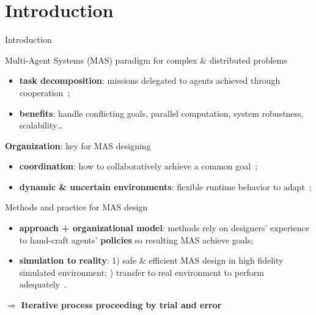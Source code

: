 \AtBeginSection[]{
    \begin{frame}
        \frametitle{}
        \tableofcontents[currentsection]
    \end{frame}
}


\section{Introduction}
\begin{frame}[allowframebreaks]{Introduction}

    \begin{block}{Multi-Agent Systems (MAS) paradigm for complex \& distributed problems}
        \begin{itemize}
            \item \textbf{task decomposition}: missions delegated to agents achieved through cooperation~\cite{Raileanu2023};
            \item \textbf{benefits}: handle conflicting goals, parallel computation, system robustness, scalability\dots
        \end{itemize}
    \end{block}

    \begin{block}{\textbf{Organization}: key for MAS designing}
        \begin{itemize}
            \item \textbf{coordination}: how to collaboratively achieve a common goal~\cite{Hubner2007};
            \item \textbf{dynamic \& uncertain environments}: flexible runtime behavior to adapt~\cite{Kathleen2020};
        \end{itemize}
    \end{block}

    \begin{block}{Methods and practice for MAS design}
        \begin{itemize}
            \item \textbf{approach + organizational model}: methods rely on designers' experience to hand-craft agents' \textbf{policies} so resulting MAS achieve goals;
            \item \textbf{simulation to reality}: 1) safe \& efficient MAS design in high fidelity simulated environment; ) transfer to real environment to perform adequately~\cite{Schon2021}.
        \end{itemize}
        \vspace{1ex}
        \quad $\Longrightarrow$ \textbf{Iterative process proceeding by trial and error}


\end{block}
\end{frame}
